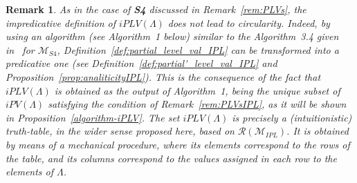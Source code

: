 \documentclass[12pt]{article}
\newtheorem{remark}[theorem]{Remark}
\newcommand{\ipl}{\ensuremath{\mathbf{IPL}}}
\begin{document}
\begin{remark} \label{non-circularity}
As in the case of {\bf S4} discussed in Remark~\ref{rem:PLVs}, the impredicative definition of $iPLV(\Lambda)$ does not lead to circularity. Indeed, by using an algorithm (see Algorithm~1 below) similar to the Algorithm~3.4 given in~\cite[p. 15]{gratz_truth_2022} for $\mathcal{M}_{S4}$, Definition~\ref{def:partial_level_val_IPL} can be transformed into a predicative one (see Definition~\ref{def:partial'_level_val_IPL} and Proposition~\ref{prop:analiticityIPL}). This is the consequence of the fact that  $iPLV(\Lambda)$ is obtained as the 
output of Algorithm~1, being the unique subset of $iPV(\Lambda)$ satisfying the condition of
Remark~\ref{rem:PLVsIPL}, as it will be shown in Proposition~\ref{algorithm-iPLV}.
The set  $iPLV(\Lambda)$ is precisely a (intuitionistic) truth-table, in the wider sense proposed here, based on  $\mathcal{R}(\mathcal{M}_{IPL})$. It is obtained by means of a mechanical procedure, where its elements correspond to the rows of the table, and its columns correspond to the values assigned in each row to the elements of $\Lambda$.
\end{remark}



\end{document}
